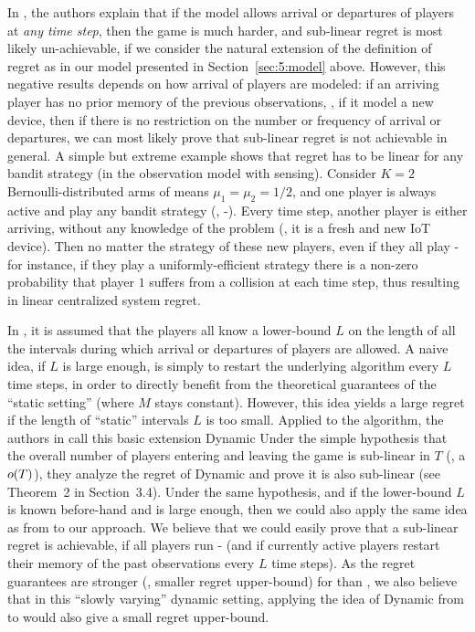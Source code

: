 In \cite{Rosenski16}, the authors explain that if the model allows arrival or departures of players at \emph{any time step}, then the game is much harder, and sub-linear regret is most likely un-achievable, if we consider the natural extension of the definition of regret as in our model presented in Section~\ref{sec:5:model} above.
However, this negative results depends on how arrival of players are modeled:
if an arriving player has no prior memory of the previous observations, \ie, if it model a new device, then if there is no restriction on the number or frequency of arrival or departures, we can most likely prove that sub-linear regret is not achievable in general.
A simple but extreme example shows that regret has to be linear for any bandit strategy (in the observation model with sensing).
Consider $K=2$ Bernoulli-distributed arms of means $\mu_1=\mu_2=1/2$, and one player is always active and play any bandit strategy (\eg, \MCTopM-\klUCB).
Every time step, another player is either arriving, without any knowledge of the problem (\eg, it is a fresh and new IoT device). Then no matter the strategy of these new players, even if they all play \MCTopM-\klUCB{} for instance, if they play a uniformly-efficient strategy there is a non-zero probability that player $1$ suffers from a collision at each time step, thus resulting in linear centralized system regret.

In \cite{Rosenski16}, it is assumed that the players all know a lower-bound $L$ on the length of all the intervals during which arrival or departures of players are allowed.
A naive idea, if $L$ is large enough, is simply to restart the underlying algorithm every $L$ time steps, in order to directly benefit from the theoretical guarantees of the ``static setting'' (where $M$ stays constant).
However, this idea yields a large regret if the length of ``static'' intervals $L$ is too small.
Applied to the \MusicalChair{} algorithm, the authors in \cite{Rosenski16} call this basic extension Dynamic \MusicalChair
Under the simple hypothesis that the overall number of players entering and leaving the game is sub-linear in $T$ (\ie, a $\mathop{}\mathopen{}o\mathopen{}\left(T\right)$), they analyze the regret of Dynamic \MusicalChair{} and prove it is also sub-linear (see Theorem~2 in Section~3.4).
%
Under the same hypothesis, and if the lower-bound $L$ is known before-hand and is large enough, then we could also apply the same idea as from \cite{Rosenski16} to our approach. We believe that we could easily prove that a sub-linear regret is achievable, if all players run \MCTopM-\klUCB{} (and if currently active players restart their memory of the past observations every $L$ time steps).
As the regret guarantees are stronger (\ie, smaller regret upper-bound) for \MCTopM{} than \MusicalChair, we also believe that in this ``slowly varying'' dynamic setting, applying the idea of Dynamic \MusicalChair{} from \cite{Rosenski16} to \MCTopM{} would also give a small regret upper-bound.

